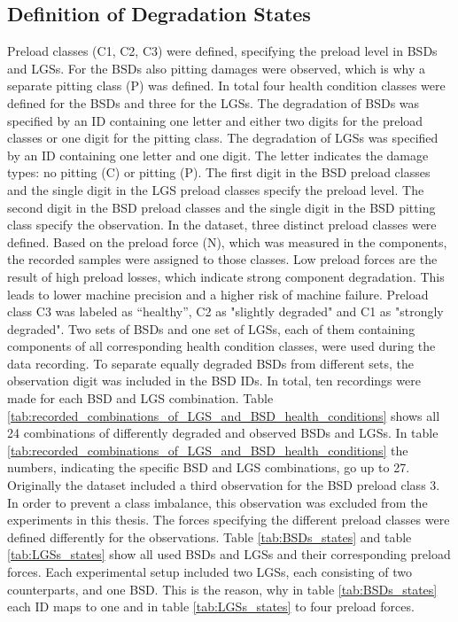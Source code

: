 \subsection{Definition of Degradation States}
Preload classes (C1, C2, C3) were defined, specifying the preload level in BSDs and LGSs. For the BSDs also pitting damages were observed, which is why a separate pitting class (P) was defined. In total four health condition classes were defined for the BSDs and three for the LGSs. The degradation of BSDs was specified by an ID containing one letter and either two digits for the preload classes or one digit for the pitting class. The degradation of LGSs was specified by an ID containing one letter and one digit. The letter indicates the damage types: no pitting (C) or pitting (P). The first digit in the BSD preload classes and the single digit in the LGS preload classes specify the preload level. The second digit in the BSD preload classes and the single digit in the BSD pitting class specify the observation. In the dataset, three distinct preload classes were defined. Based on the preload force (N), which was measured in the components, the recorded samples were assigned to those classes. Low preload forces are the result of high preload losses, which indicate strong component degradation. This leads to lower machine precision and a higher risk of machine failure. Preload class C3 was labeled as “healthy”, C2 as "slightly degraded" and C1 as "strongly degraded". Two sets of BSDs and one set of LGSs, each of them containing components of all corresponding health condition classes, were used during the data recording. To separate equally degraded BSDs from different sets, the observation digit was included in the BSD IDs. In total, ten recordings were made for each BSD and LGS combination. Table \ref{tab:recorded_combinations_of_LGS_and_BSD_health_conditions} shows all 24 combinations of differently degraded and observed BSDs and LGSs. In table \ref{tab:recorded_combinations_of_LGS_and_BSD_health_conditions} the numbers, indicating the specific BSD and LGS combinations, go up to 27. Originally the dataset included a third observation for the BSD preload class 3. In order to prevent a class imbalance, this observation was excluded from the experiments in this thesis. The forces specifying the different preload classes were defined differently for the observations. Table \ref {tab:BSDs_states} and table \ref {tab:LGSs_states} show all used BSDs and LGSs and their corresponding preload forces. Each experimental setup included two LGSs, each consisting of two counterparts, and one BSD. This is the reason, why in table \ref {tab:BSDs_states} each ID maps to one and in table \ref {tab:LGSs_states} to four preload forces.



